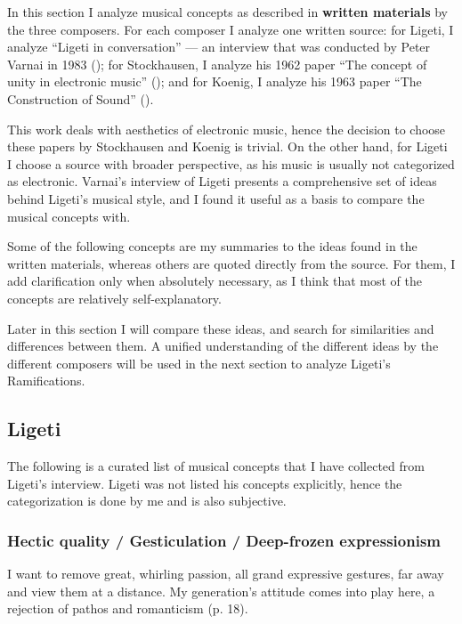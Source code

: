 \documentclass[a4paper,11pt]{article}
\newenvironment{MyShadequote}[1][]
    {\begin{mdframed}[style=MyShadeQuoteStyle,#1]}
    {\end{mdframed}}
\begin{document}
In this section I analyze musical concepts as described in \textbf{written materials} by the three composers.
For each composer I analyze one written source:
for Ligeti, I analyze ``Ligeti in conversation'' --- an interview that was conducted by Peter Varnai in 1983 (\citeauthor{varnai});
for Stockhausen, I analyze his 1962 paper ``The concept of unity in electronic music'' (\citeauthor{stockhausen});
and for Koenig, I analyze his 1963 paper ``The Construction of Sound'' (\citeauthor{koenig}).

This work deals with aesthetics of electronic music, hence the decision to choose these papers by Stockhausen and Koenig is trivial.
On the other hand, for Ligeti I choose a source with broader perspective, as his music is usually not categorized as electronic.
Varnai's interview of Ligeti presents a comprehensive set of ideas behind Ligeti's musical style, and I found it useful as a basis to compare the musical concepts with.

Some of the following concepts are my summaries to the ideas found in the written materials, whereas others are quoted directly from the source.
For them, I add clarification only when absolutely necessary, as I think that most of the concepts are relatively self-explanatory.

Later in this section I will compare these ideas, and search for similarities and differences between them.
A unified understanding of the different ideas by the different composers will be used in the next section to analyze Ligeti's Ramifications.

\subsection{Ligeti}
\label{sub:eshtetic_ligeti}

The following is a curated list of musical concepts that I have collected from Ligeti's interview.
Ligeti was not listed his concepts explicitly, hence the categorization is done by me and is also subjective.

\subsubsection{Hectic quality / Gesticulation / Deep-frozen expressionism}
\label{subs:ligeti:hectic}

\begin{MyShadequote}
  I want to remove great, whirling passion, all grand expressive gestures, far away and view them at a distance.
  My generation's attitude comes into play here, a rejection of pathos and romanticism (p. 18).
\end{MyShadequote}
\end{document}
